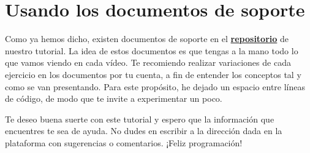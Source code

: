 \section{Usando los documentos de soporte}

Como ya hemos dicho, existen documentos de soporte en el \href{
https://github.com/DarienBrito/Quadro_SCIntro}{\textbf{repositorio}} de nuestro tutorial. La idea de estos documentos es que tengas a la mano todo lo que vamos viendo en cada vídeo. Te recomiendo realizar variaciones de cada ejercicio en los documentos por tu cuenta, a fin de entender los conceptos tal y como se van presentando. Para este propósito, he dejado un espacio entre líneas de código, de modo que te invite a experimentar un poco.

Te deseo buena suerte con este tutorial y espero que la información que encuentres te sea de ayuda. No dudes en escribir a la dirección dada en la plataforma con sugerencias o comentarios. ¡Feliz programación!

